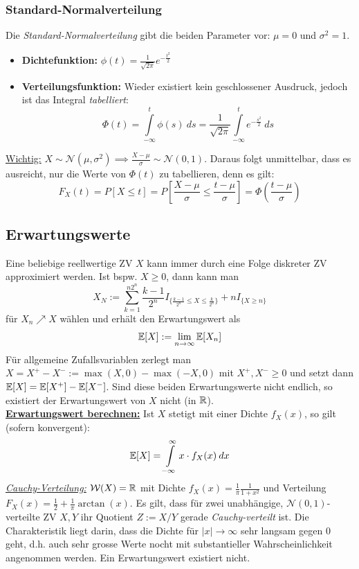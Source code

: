 \subsubsection{Standard-Normalverteilung}
Die \textit{Standard-Normalverteilung} gibt die beiden Parameter vor: $\mu = 0$ und $\sigma^2 = 1$.
\begin{itemize}
\item \textbf{Dichtefunktion:} $\phi(t) = \frac{1}{\sqrt{2\pi}}e^{-\frac{t^2}{2}}$
\item \textbf{Verteilungsfunktion:} Wieder existiert kein geschlossener Ausdruck, jedoch ist das Integral \textit{tabelliert}:
$$ \Phi(t) = \int\limits_{-\infty}^t \phi(s) \: ds = \frac{1}{\sqrt{2\pi}} \int\limits_{-\infty}^t e^{-\frac{s^2}{2}}\: ds$$
\end{itemize}
\underline{Wichtig:} $X \sim \mathcal{N}(\mu, \sigma^2) \implies  \frac{X-\mu}{\sigma} \sim \mathcal{N}(0,1)$. Daraus folgt unmittelbar, dass es ausreicht, nur die Werte von $\Phi(t)$ zu tabellieren, denn es gilt:
$$ F_X(t) = P[X \leq t] = P\left[ \frac{X-\mu}{\sigma} \leq \frac{t-\mu}{\sigma} \right] = \Phi\left(\frac{t-\mu}{\sigma}\right)$$


\subsection{Erwartungswerte}
Eine beliebige reellwertige ZV $X$ kann immer durch eine Folge diskreter ZV approximiert werden. Ist bspw. $X \geq 0$, dann kann man 
$$ X_N := \sum_{k=1}^{n2^n} \frac{k-1}{2^n}I_{\{\frac{k-1}{2^n} \leq X \leq \frac{k}{2^n}\}} + nI_{\{X \geq n\}}$$
für $X_n \nearrow X$ wählen und erhält den Erwartungswert als $$ \mathbb{E}[X] := \lim_{n\to\infty} \mathbb{E}[X_n]$$
Für allgemeine Zufallsvariablen zerlegt man $X = X^+ - X^- := \max{(X,0)} - \max{(-X,0)}$ mit $X^+, X^- \geq 0$ und setzt dann $\mathbb{E}[X] = \mathbb{E}[X^+] - \mathbb{E}[X^-]$. Sind diese beiden Erwartungswerte nicht endlich, so existiert der Erwartungswert von $X$ nicht (in $\mathbb{R}$).\\

\underline{\textbf{Erwartungswert berechnen:}} Ist $X$ stetigt mit einer Dichte $f_X(x)$, so gilt (sofern konvergent):
$$ \mathbb{E}[X] = \int \limits_{-\infty}^{\infty} x \cdot f_X(x) \: dx$$
\underline{\textit{Cauchy-Verteilung:}} $\mathcal{W}(X) = \mathbb{R}$ mit Dichte $f_X(x) = \frac{1}{\pi}\frac{1}{1+x^2}$ und Verteilung $F_X(x) = \frac{1}{2} + \frac{1}{\pi} \arctan(x)$. Es gilt, dass für zwei unabhängige, $\mathcal{N}(0,1)$-verteilte ZV $X,Y$ ihr Quotient $Z := X/Y$ gerade \textit{Cauchy-verteilt} ist. Die Charakteristik liegt darin, dass die Dichte für $|x| \to \infty$ sehr langsam gegen 0 geht, d.h. auch sehr grosse Werte nocht mit substantieller Wahrscheinlichkeit angenommen werden. Ein Erwartungswert existiert nicht.\\

